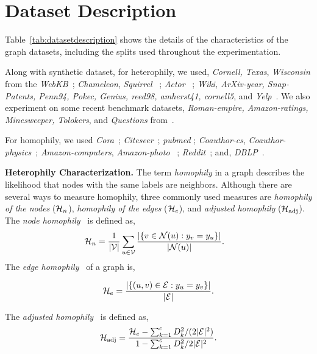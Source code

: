 \section{Dataset Description}
\label{app:dataset}

Table~\ref{tab:datasetdescription} shows the details of the characteristics of the graph datasets, including the splits used throughout the experimentation.

Along with synthetic dataset, for heterophily, we used, 
\textit{Cornell, Texas}, \textit{Wisconsin} from the \textit{WebKB}~\cite{pei2020geom}; \textit{Chameleon}, \textit{Squirrel} ~\cite{rozemberczki2021multi}; \textit{Actor} ~\cite{pei2020geom}; \textit{Wiki, ArXiv-year, Snap-Patents, Penn94, Pokec, Genius, reed98, amherst41, cornell5}, and \textit{Yelp}~\cite{lim2021large}. 
We also experiment on some recent benchmark datasets, \textit{Roman-empire, Amazon-ratings, Minesweeper, Tolokers}, and \textit{Questions} from~\cite{platonov2023critical}.

For homophily, we used
\textit{Cora}~\cite{sen2008collective}; \textit{Citeseer}~\cite{giles1998citeseer}; \textit{pubmed} \cite{namata2012query}; \textit{Coauthor-cs}, \textit{Coauthor-physics}~\cite{shchur2018pitfalls}; \textit{Amazon-computers},  \textit{Amazon-photo} ~\cite{shchur2018pitfalls}; \textit{Reddit}~\cite{hamilton2017inductive}; and, \textit{DBLP}~\cite{fu2020magnn}. 

\noindent\textbf{Heterophily Characterization.} The term \emph{homophily} in a graph describes the likelihood that nodes with the same labels are neighbors. Although there are several ways to measure homophily, three commonly used measures are {\em homophily of the nodes} (${\mathcal{H}}_{n}$), {\em homophily of the edges} (${\mathcal{H}}_{e}$), and {\em adjusted homophily} (${\mathcal{H}}_\mathrm{adj}$).
The {\em node homophily}~\cite{pei2020geom} is defined as,  
\begin{align}
{\mathcal{H}}_{n} & = \frac{1}{|{\mathcal{V}}|} \sum_{u\in {\mathcal{V}}}\frac{| \{v\in {\mathcal{N}}(u) : y_v = y_u\}|}{|{\mathcal{N}}(u)|}.
\end{align}
The {\em edge homophily}~\cite{zhu2020beyond} of a graph is,

\begin{equation}
    {\mathcal{H}}_{e} = \frac{|\{(u,v)\in {\mathcal{E}} : y_u = y_v\}|}{|{\mathcal{E}}|}. 
\end{equation}

The 
{\em adjusted homophily}~\cite{platonov2022characterizing} is defined as,
\begin{equation}
    {\mathcal{H}}_\mathrm{adj} = \frac{{\mathcal{H}}_{e}-\sum_{k=1}^{c} D_k^2/(2|{\mathcal{E}}|^2)}{1-\sum_{k=1}^c D_k^2/2|{\mathcal{E}}|^2}. 
\end{equation}


